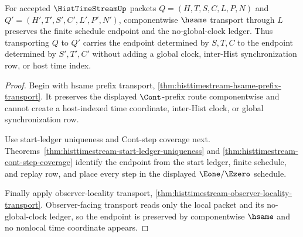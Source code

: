 \begin{theorem}
\label{thm:histtimestream-hsame-schedule-endpoint-transport}
For accepted $\HistTimeStreamUp$ packets $Q=(H,T,S,C,L,P,N)$ and $Q'=(H',T',S',C',L',P',N')$, componentwise $\hsame$ transport through $L$ preserves the finite schedule endpoint and the no-global-clock ledger. Thus transporting $Q$ to $Q'$ carries the endpoint determined by $S,T,C$ to the endpoint determined by $S',T',C'$ without adding a global clock, inter-Hist synchronization row, or host time index.
\end{theorem}
\begin{proof}
Begin with hsame prefix transport, \autoref{thm:histtimestream-hsame-prefix-transport}. It preserves the displayed $\Cont$-prefix route componentwise and cannot create a host-indexed time coordinate, inter-Hist clock, or global synchronization row.

Use start-ledger uniqueness and Cont-step coverage next. Theorems~\ref{thm:histtimestream-start-ledger-uniqueness} and \ref{thm:histtimestream-cont-step-coverage} identify the endpoint from the start ledger, finite schedule, and replay row, and place every step in the displayed $\Eone/\Ezero$ schedule.

Finally apply observer-locality transport, \autoref{thm:histtimestream-observer-locality-transport}. Observer-facing transport reads only the local packet and its no-global-clock ledger, so the endpoint is preserved by componentwise $\hsame$ and no nonlocal time coordinate appears.
\end{proof}

